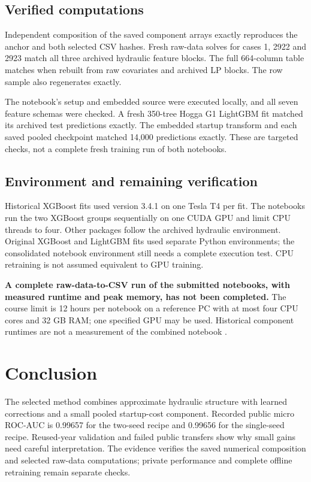 \documentclass[a4paper,11pt]{article}
\begin{document}
\subsection*{Verified computations}
Independent composition of the saved component arrays exactly reproduces the anchor and both selected CSV hashes. Fresh raw-data solves for cases 1, 2922 and 2923 match all three archived hydraulic feature blocks. The full 664-column table matches when rebuilt from raw covariates and archived LP blocks. The row sample also regenerates exactly.

The notebook's setup and embedded source were executed locally, and all seven feature schemas were checked. A fresh 350-tree Hogga G1 LightGBM fit matched its archived test predictions exactly. The embedded startup transform and each saved pooled checkpoint matched 14,000 predictions exactly. These are targeted checks, not a complete fresh training run of both notebooks.

\subsection*{Environment and remaining verification}
Historical XGBoost fits used version 3.4.1 on one Tesla T4 per fit. The notebooks run the two XGBoost groups sequentially on one CUDA GPU and limit CPU threads to four. Other packages follow the archived hydraulic environment. Original XGBoost and LightGBM fits used separate Python environments; the consolidated notebook environment still needs a complete execution test. CPU retraining is not assumed equivalent to GPU training.

\textbf{A complete raw-data-to-CSV run of the submitted notebooks, with measured runtime and peak memory, has not been completed.} The course limit is 12 hours per notebook on a reference PC with at most four CPU cores and 32 GB RAM; one specified GPU may be used. Historical component runtimes are not a measurement of the combined notebook \cite{grading}.

\section{Conclusion}
The selected method combines approximate hydraulic structure with learned corrections and a small pooled startup-cost component. Recorded public micro ROC-AUC is 0.99657 for the two-seed recipe and 0.99656 for the single-seed recipe. Reused-year validation and failed public transfers show why small gains need careful interpretation. The evidence verifies the saved numerical composition and selected raw-data computations; private performance and complete offline retraining remain separate checks.
\end{document}
